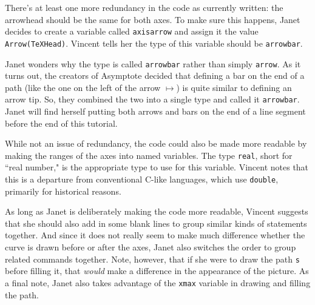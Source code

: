 \documentclass{article}
\begin{document}
\medskip
There's at least one more redundancy in the code as currently written: the arrowhead
should be the same for both axes.  To make sure this happens, Janet decides to create a 
variable called \verb;axisarrow; and assign it the value 
\verb;Arrow(TeXHead);.  Vincent tells 
her the type of this variable should be \verb;arrowbar;.

Janet wonders why the type is called \verb;arrowbar; 
rather than simply \verb;arrow;.  
As it turns out, the creators of Asymptote decided that defining a bar on the end of a path 
(like the one on the left of the arrow $\mapsto$)
is quite similar to defining an arrow tip.  So, they combined the two into a single type 
and called it \verb;arrowbar;.  Janet will find herself putting both arrows and bars on the 
end of a line segment before the end of this tutorial.

While not an issue of redundancy, the code could also be made more 
readable by 
making the ranges of the axes into named variables.  The type \verb;real;, short for 
``real number," is the appropriate type to use for this variable.  Vincent notes that this is 
a departure from conventional C-like languages, which use \verb;double;, primarily 
for historical reasons.

As long as Janet is deliberately making the code more readable, Vincent suggests that she should 
also add in some blank lines 
to group similar kinds of statements together.  And since it does not 
really seem to make much difference whether the curve is drawn before or after the axes,
 Janet also switches the order to group related commands together.  Note, however, that if she were to 
draw the path \verb;s; before filling it, that \emph{would} make a difference in the appearance of the picture. 
As a final note, Janet also takes advantage of the \verb;xmax; variable in drawing and filling the path.
\end{document}
